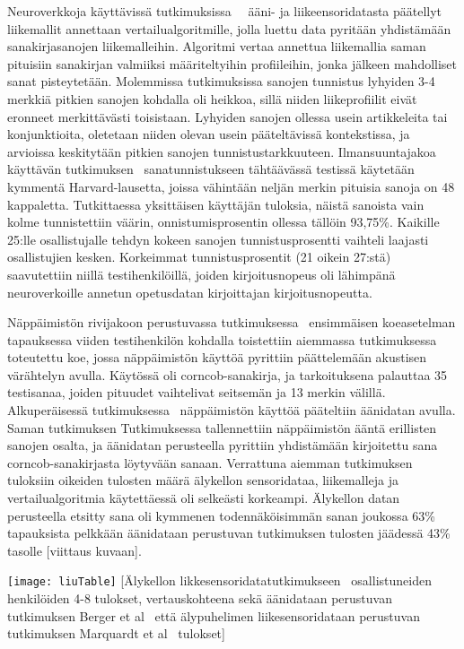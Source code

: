 \documentclass[finnish]{tktltiki2}
\theoremstyle{definition}
\theoremstyle{remark}
\begin{document}
Neuroverkkoja käyttävissä tutkimuksissa~\cite{maiti}~\cite{liu} ääni- ja liikeensoridatasta päätellyt liikemallit annettaan vertailualgoritmille, jolla luettu data pyritään yhdistämään sanakirjasanojen liikemalleihin. Algoritmi vertaa annettua liikemallia saman pituisiin sanakirjan valmiiksi määriteltyihin profiileihin, jonka jälkeen mahdolliset sanat pisteytetään. Molemmissa tutkimuksissa sanojen tunnistus lyhyiden 3-4 merkkiä pitkien sanojen kohdalla oli heikkoa, sillä niiden liikeprofiilit eivät eronneet merkittävästi toisistaan. Lyhyiden sanojen ollessa usein artikkeleita tai konjunktioita, oletetaan niiden olevan usein pääteltävissä kontekstissa, ja arvioissa keskitytään pitkien sanojen tunnistustarkkuuteen. Ilmansuuntajakoa käyttävän tutkimuksen~\cite{maiti} sanatunnistukseen tähtäävässä testissä käytetään kymmentä Harvard-lausetta, joissa vähintään neljän merkin pituisia sanoja on 48 kappaletta. Tutkittaessa yksittäisen käyttäjän tuloksia, näistä sanoista vain kolme tunnistettiin väärin, onnistumisprosentin ollessa tällöin 93,75\%. Kaikille 25:lle osallistujalle tehdyn kokeen sanojen tunnistusprosentti vaihteli laajasti osallistujien kesken. Korkeimmat tunnistusprosentit (21 oikein 27:stä) saavutettiin niillä testihenkilöillä, joiden kirjoitusnopeus oli lähimpänä neuroverkoille annetun opetusdatan kirjoittajan kirjoitusnopeutta. 

Näppäimistön rivijakoon perustuvassa tutkimuksessa~\cite{liu} ensimmäisen koeasetelman tapauksessa viiden testihenkilön kohdalla toistettiin aiemmassa tutkimuksessa~\cite{berger} toteutettu koe, jossa näppäimistön käyttöä pyrittiin päättelemään akustisen värähtelyn avulla. Käytössä oli corncob-sanakirja, ja tarkoituksena palauttaa 35 testisanaa, joiden pituudet vaihtelivat seitsemän ja 13 merkin välillä.
Alkuperäisessä tutkimuksessa~\cite{berger} näppäimistön käyttöä pääteltiin äänidatan avulla. Saman tutkimuksen  Tutkimuksessa tallennettiin näppäimistön ääntä erillisten sanojen osalta, ja äänidatan perusteella pyrittiin yhdistämään kirjoitettu sana corncob-sanakirjasta löytyvään sanaan. Verrattuna aiemman tutkimuksen tuloksiin oikeiden tulosten määrä älykellon sensoridataa, liikemalleja ja vertailualgoritmia käytettäessä oli selkeästi korkeampi. Älykellon datan perusteella etsitty sana oli kymmenen todennäköisimmän sanan joukossa 63\% tapauksista pelkkään äänidataan perustuvan tutkimuksen tulosten jäädessä 43\% tasolle [viittaus kuvaan].
\linebreak

\texttt{[image: liuTable]}
[Älykellon likkesensoridatatutkimukseen~\cite{liu} osallistuneiden henkilöiden 4-8 tulokset, vertauskohteena sekä äänidataan perustuvan tutkimuksen Berger et al~\cite{berger} että älypuhelimen liikesensoridataan perustuvan tutkimuksen Marquardt et al~\cite{mar} tulokset]
\end{document}
